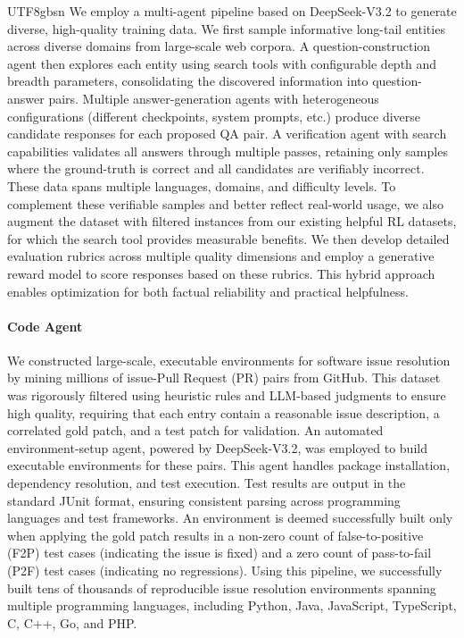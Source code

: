 \documentclass[11pt, a4paper, logo, copyright, nonumbering]{deepseek}
\begin{document}
\begin{CJK*}{UTF8}{gbsn}
We employ a multi-agent pipeline based on DeepSeek-V3.2 to generate diverse, high-quality training data. 
We first sample informative long-tail entities across diverse domains from large-scale web corpora. 
A question-construction agent then explores each entity using search tools with configurable depth and breadth parameters, consolidating the discovered information into question-answer pairs. 
Multiple answer-generation agents with heterogeneous configurations (different checkpoints, system prompts, etc.) produce diverse candidate responses for each proposed QA pair. 
A verification agent with search capabilities validates all answers through multiple passes, retaining only samples where the ground-truth is correct and all candidates are verifiably incorrect. 
These data spans multiple languages, domains, and difficulty levels. 
To complement these verifiable samples and better reflect real-world usage, we also augment the dataset with filtered instances from our existing helpful RL datasets, for which the search tool provides measurable benefits.
We then develop detailed evaluation rubrics across multiple quality dimensions and employ a generative reward model to score responses based on these rubrics. 
This hybrid approach enables optimization for both factual reliability and practical helpfulness.

\paragraph{Code Agent}

We constructed large-scale, executable environments for software issue resolution by mining millions of issue-Pull Request (PR) pairs from GitHub. This dataset was rigorously filtered using heuristic rules and LLM-based judgments to ensure high quality, requiring that each entry contain a reasonable issue description, a correlated gold patch, and a test patch for validation. An automated environment-setup agent, powered by DeepSeek-V3.2, was employed to build executable environments for these pairs. This agent handles package installation, dependency resolution, and test execution. Test results are output in the standard JUnit format, ensuring consistent parsing across programming languages and test frameworks. An environment is deemed successfully built only when applying the gold patch results in a non-zero count of false-to-positive (F2P) test cases (indicating the issue is fixed) and a zero count of pass-to-fail (P2F) test cases (indicating no regressions). Using this pipeline, we successfully built tens of thousands of reproducible issue resolution environments spanning multiple programming languages, including Python, Java, JavaScript, TypeScript, C, C++, Go, and PHP.


\end{CJK*}
\end{document}
